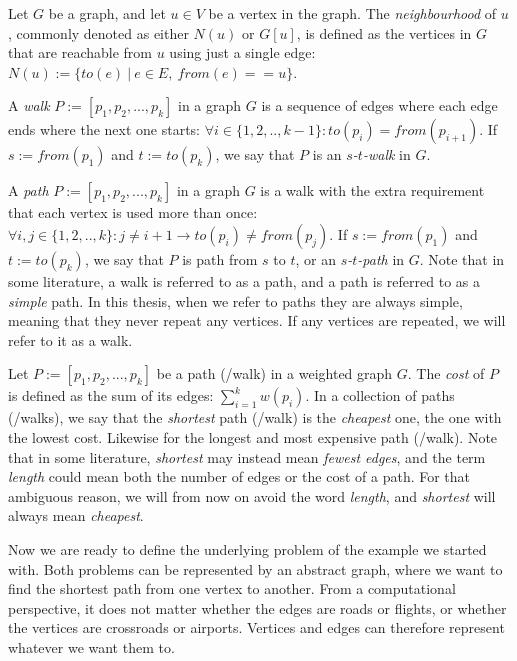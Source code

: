 \begin{definition}[Neighbourhood]
    Let $G$ be a graph, and let $u \in V$ be a vertex in the graph. The \emph{neighbourhood} of $u$, commonly denoted as either $N(u)$ or $G[u]$, is defined as the vertices in $G$ that are reachable from $u$ using just a single edge: $N(u) := \{ to(e)  ~|~  e \in E, ~ from(e) == u\}$.
\end{definition}

\begin{definition}[Walk]
    A \emph{walk} $P := [p_1, p_2, ..., p_k]$ in a graph $G$ is a sequence of edges where each edge ends where the next one starts: $\forall i \in \{1,2,..,k-1\} : to(p_i) = from(p_{i+1})$.
    If $s := from(p_1)$ and $t := to(p_k)$, we say that $P$ is an \emph{$s$-$t$-walk} in $G$.
\end{definition}

\begin{definition}[Path]
    A \emph{path} $P := [p_1, p_2, ..., p_k]$ in a graph $G$ is a walk with the extra requirement that each vertex is used more than once: $\forall i, j \in \{1,2,..,k\} : j \neq {i+1} \rightarrow to(p_i) \neq from(p_j)$.
    If $s := from(p_1)$ and $t := to(p_k)$, we say that $P$ is path from $s$ to $t$, or an \emph{$s$-$t$-path} in $G$.
    Note that in some literature, a walk is referred to as a path, and a path is referred to as a \emph{simple} path. In this thesis, when we refer to paths they are always simple, meaning that they never repeat any vertices. If any vertices are repeated, we will refer to it as a walk.    
\end{definition}

\begin{definition}
    Let $P := [p_1, p_2, ..., p_k]$ be a path (/walk) in a weighted graph $G$. The \emph{cost} of $P$ is defined as the sum of its edges: $\sum_{i=1}^k w(p_i)$. In a collection of paths (/walks), we say that the \emph{shortest} path (/walk) is the \emph{cheapest} one, the one with the lowest cost. Likewise for the longest and most expensive path (/walk). Note that in some literature, \emph{shortest} may instead mean \emph{fewest edges}, and the term \emph{length} could mean both the number of edges or the cost of a path. For that ambiguous reason, we will from now on avoid the word \emph{length}, and \emph{shortest} will always mean \emph{cheapest}.
\end{definition}

Now we are ready to define the underlying problem of the example we started with. Both problems can be represented by an abstract graph, where we want to find the shortest path from one vertex to another. From a computational perspective, it does not matter whether the edges are roads or flights, or whether the vertices are crossroads or airports. Vertices and edges can therefore represent whatever we want them to.

